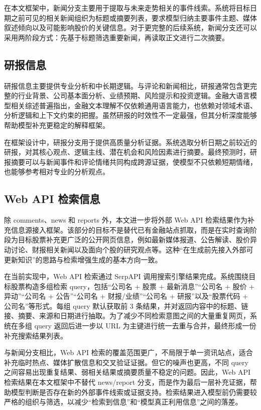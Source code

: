 在本文框架中，新闻分支主要用于提取与未来走势相关的事件线索。系统将目标日期之前可见的相关新闻组织为标题或摘要列表，要求模型归纳主要事件主题、媒体叙述倾向以及可能影响股价的关键信息。对于更完整的后续系统，新闻分支还可以采用两阶段方式：先基于标题筛选重要新闻，再读取正文进行二次摘要。

\subsection{研报信息}

研报信息主要提供专业分析和中长期逻辑。与评论和新闻相比，研报通常包含更完整的行业背景、公司基本面分析、业绩预期、风险提示和投资逻辑。金融大语言模型相关综述普遍指出，金融文本理解不仅依赖通用语言能力，也依赖对领域术语、分析逻辑和上下文约束的把握\cite{lee2024finllms,li2023llmfinance,nie2024llmfinancialapplications}。虽然研报的时效性不一定最强，但其分析深度能够帮助模型补充更稳定的解释框架。

在框架设计中，研报分支用于提供高质量分析证据。系统选取分析日期之前较近的研报，对其核心观点、逻辑主线、潜在机会和风险因素进行摘要。最终预测时，研报摘要可以与新闻事件和评论情绪共同构成跨源证据，使模型不只依赖短期情绪，也能够参考相对专业的分析观点。

\subsection{Web API 检索信息}

除 comments、news 和 reports 外，本文进一步将外部 Web API 检索结果作为补充信息源接入框架。该部分的目标不是替代已有金融站点抓取，而是在实时查询阶段为目标股票补充更广泛的公开网页信息，例如最新媒体报道、公告解读、股价异动讨论、财报相关新闻以及面向个股的研究观点等。这种“在生成前先接入外部可更新知识”的思路与检索增强生成的基本方向一致\cite{lewis2020rag,ye2024r2ag}。

在当前实现中，Web API 检索通过 SerpAPI 调用搜索引擎结果完成。系统围绕目标股票构造多组检索 query，包括“公司名 + 股票 + 最新消息”“公司名 + 股价 + 异动”“公司名 + 公告”“公司名 + 财报/业绩”“公司名 + 研报”以及“股票代码 + 公司名”等形式。每组 query 默认获取前 3 条结果，并对返回内容中的标题、链接、摘要、来源和日期进行抽取。为了减少不同检索意图之间的大量重复网页，系统在多组 query 返回后进一步以 URL 为主键进行统一去重与合并，最终形成一份补充搜索结果列表。

与新闻分支相比，Web API 检索的覆盖范围更广，不局限于单一资讯站点，适合补充临时热点、媒体扩散信息和交叉验证证据。但它的噪声也更高，不同 query 之间容易出现重复结果、弱相关结果或摘要质量不稳定的问题。因此，Web API 检索结果在本文框架中不替代 news/report 分支，而是作为最后一层补充证据，帮助模型判断是否存在新的外部事件线索或证据支持。检索结果进入模型前仍需要较严格的组织与筛选，以减少“检索到信息”和“模型真正利用信息”之间的落差\cite{ye2024r2ag}。


